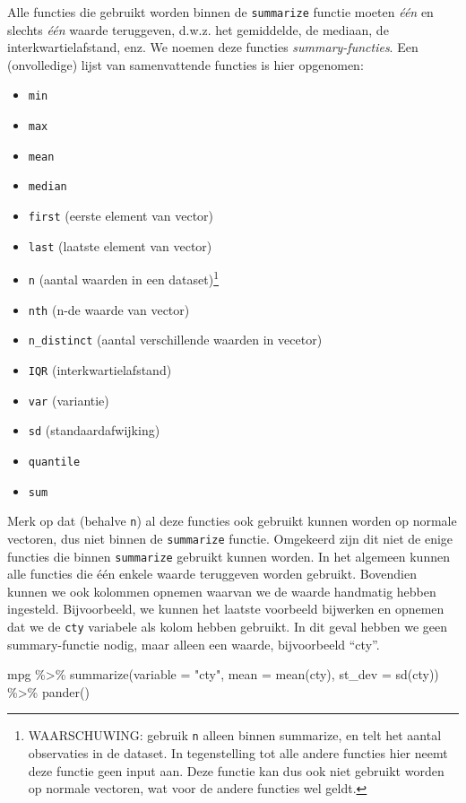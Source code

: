 \documentclass[]{tufte-book}
\newenvironment{Shaded}{}{}
\newcommand{\AttributeTok}[1]{\textcolor[rgb]{0.49,0.56,0.16}{#1}}
\newcommand{\FunctionTok}[1]{\textcolor[rgb]{0.02,0.16,0.49}{#1}}
\newcommand{\NormalTok}[1]{#1}
\newcommand{\SpecialCharTok}[1]{\textcolor[rgb]{0.25,0.44,0.63}{#1}}
\newcommand{\StringTok}[1]{\textcolor[rgb]{0.25,0.44,0.63}{#1}}
\providecommand{\tightlist}{%
  \setlength{\itemsep}{0pt}\setlength{\parskip}{0pt}}
\begin{document}
Alle functies die gebruikt worden binnen de \texttt{summarize} functie moeten \emph{één} en slechts \emph{één} waarde teruggeven, d.w.z. het gemiddelde, de mediaan, de interkwartielafstand, enz. We noemen deze functies \emph{summary-functies}. Een (onvolledige) lijst van samenvattende functies is hier opgenomen:

\begin{itemize}
\tightlist
\item
  \texttt{min}
\item
  \texttt{max}
\item
  \texttt{mean}
\item
  \texttt{median}
\item
  \texttt{first} (eerste element van vector)
\item
  \texttt{last} (laatste element van vector)
\item
  \texttt{n} (aantal waarden in een dataset)\footnote{WAARSCHUWING: gebruik \texttt{n} alleen binnen summarize, en telt het aantal observaties in de dataset. In tegenstelling tot alle andere functies hier neemt deze functie geen input aan. Deze functie kan dus ook niet gebruikt worden op normale vectoren, wat voor de andere functies wel geldt.}
\item
  \texttt{nth} (n-de waarde van vector)
\item
  \texttt{n\_distinct} (aantal verschillende waarden in vecetor)
\item
  \texttt{IQR} (interkwartielafstand)
\item
  \texttt{var} (variantie)
\item
  \texttt{sd} (standaardafwijking)
\item
  \texttt{quantile}
\item
  \texttt{sum}
\end{itemize}

Merk op dat (behalve \texttt{n}) al deze functies ook gebruikt kunnen worden op normale vectoren, dus niet binnen de \texttt{summarize} functie. Omgekeerd zijn dit niet de enige functies die binnen \texttt{summarize} gebruikt kunnen worden. In het algemeen kunnen alle functies die één enkele waarde teruggeven worden gebruikt. Bovendien kunnen we ook kolommen opnemen waarvan we de waarde handmatig hebben ingesteld. Bijvoorbeeld, we kunnen het laatste voorbeeld bijwerken en opnemen dat we de \texttt{cty} variabele als kolom hebben gebruikt. In dit geval hebben we geen summary-functie nodig, maar alleen een waarde, bijvoorbeeld ``cty''.

\begin{Shaded}
\begin{Highlighting}[]
\NormalTok{mpg }\SpecialCharTok{\%\textgreater{}\%}
  \FunctionTok{summarize}\NormalTok{(}\AttributeTok{variable =} \StringTok{"cty"}\NormalTok{, }\AttributeTok{mean =} \FunctionTok{mean}\NormalTok{(cty), }\AttributeTok{st\_dev =} \FunctionTok{sd}\NormalTok{(cty)) }\SpecialCharTok{\%\textgreater{}\%}
  \FunctionTok{pander}\NormalTok{()}
\end{Highlighting}
\end{Shaded}
\end{document}

